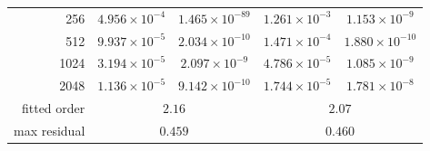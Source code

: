 \begin{table}[htbp]
\begin{tabular}{r cc cc}
256 & $4.956\times10^{-4}$ & $1.465\times10^{-89}$ & {\boldmath$1.261\times10^{-3}$} & $1.153\times10^{-9}$ \\
512 & $9.937\times10^{-5}$ & $2.034\times10^{-10}$ & {\boldmath$1.471\times10^{-4}$} & $1.880\times10^{-10}$ \\
1024 & $3.194\times10^{-5}$ & $2.097\times10^{-9}$ & {\boldmath$4.786\times10^{-5}$} & $1.085\times10^{-9}$ \\
2048 & $1.136\times10^{-5}$ & $9.142\times10^{-10}$ & {\boldmath$1.744\times10^{-5}$} & $1.781\times10^{-8}$ \\
\quad fitted order & \multicolumn{2}{c}{$2.16$} & \multicolumn{2}{c}{$2.07$} \\
\quad max residual & \multicolumn{2}{c}{$0.459$} & \multicolumn{2}{c}{$0.460$} \\
\bottomrule
\end{tabular}
\end{table}
